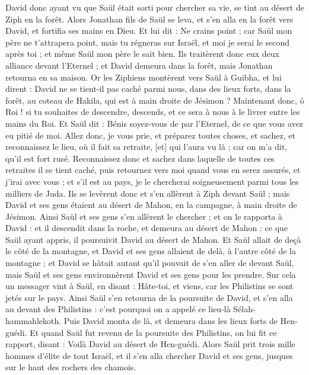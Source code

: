 \begin{multicols}{2}
David donc ayant vu que Saül était sorti pour chercher sa vie, se tint au désert de Ziph en la forêt.
Alors Jonathan fils de Saül se leva, et s'en alla en la forêt vers David, et fortifia ses mains en Dieu.
Et lui dit : Ne crains point ; car Saül mon père ne t'attrapera point, mais tu régneras sur Israël, et moi je serai le second après toi ; et même Saül mon père le sait bien.
Ils traitèrent donc eux deux alliance devant l'Eternel ; et David demeura dans la forêt, mais Jonathan retourna en sa maison.
Or les Ziphiens montèrent vers Saül à Guibha, et lui dirent : David ne se tient-il pas caché parmi nous, dans des lieux forts, dans la forêt, au coteau de Hakila, qui est à main droite de Jésimon ?
Maintenant donc, ô Roi ! si tu souhaites de descendre, descends, et ce sera à nous à le livrer entre les mains du Roi.
Et Saül dit : Bénis soyez-vous de par l'Eternel, de ce que vous avez eu pitié de moi.
Allez donc, je vous prie, et préparez toutes choses, et sachez, et reconnaissez le lieu, où il fait sa retraite, [et] qui l'aura vu là ; car on m'a dit, qu'il est fort rusé.
Reconnaissez donc et sachez dans laquelle de toutes ces retraites il se tient caché, puis retournez vers moi quand vous en serez assurés, et j'irai avec vous ; et s'il est au pays, je le chercherai soigneusement parmi tous les milliers de Juda.
Ils se levèrent donc et s'en allèrent à Ziph devant Saül ; mais David et ses gens étaient au désert de Mahon, en la campagne, à main droite de Jésimon.
Ainsi Saül et ses gens s'en allèrent le chercher ; et on le rapporta à David : et il descendit dans la roche, et demeura au désert de Mahon : ce que Saül ayant appris, il poursuivit David au désert de Mahon.
Et Saül allait de deçà le côté de la montagne, et David et ses gens allaient de delà, à l'autre côté de la montagne ; et David se hâtait autant qu'il pouvait de s'en aller de devant Saül, mais Saül et ses gens environnèrent David et ses gens pour les prendre.
Sur cela un messager vint à Saül, en disant : Hâte-toi, et viens, car les Philistins se sont jetés sur le pays.
Ainsi Saül s'en retourna de la poursuite de David, et s'en alla au devant des Philistins : c'est pourquoi on a appelé ce lieu-là Sélah-hammahlekoth.
\VerseOne{}Puis David monta de là, et demeura dans les lieux forts de Hen-guédi.
Et quand Saül fut revenu de la poursuite des Philistins, on lui fit ce rapport, disant : Voilà David au désert de Hen-guédi.
Alors Saül prit trois mille hommes d'élite de tout Israël, et il s'en alla chercher David et ses gens, jusques sur le haut des rochers des chamois.

\end{multicols}

